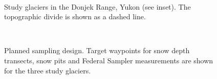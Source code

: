 \documentclass{sfuthesis}
\begin{document}
\begin{landscape}
\begin{figure}
	\centering
	\\
	\caption{Study glaciers in the Donjek Range, Yukon (see inset). The topographic divide is shown as a dashed line.}
	\label{studysites}
\end{figure}

\begin{figure}
	\centering
	\\
	\caption{Planned sampling design. Target waypoints for snow depth transects, snow pits and Federal Sampler measurements are shown for the three study glaciers.}
	\label{transect_planned}
	\end{figure}


\end{landscape}
\end{document}
